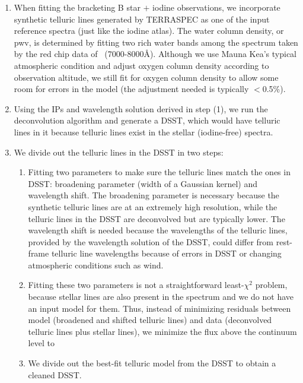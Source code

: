 \begin{enumerate}
\item When fitting the bracketing B star $+$ iodine observations, we
  incorporate synthetic telluric lines generated by TERRASPEC as one of
  the input reference spectra (just like the iodine atlas). The water
  column density, or pwv, is determined by fitting two rich water bands
  among the spectrum taken by the red chip data of \keck\
  (7000-8000\AA). Although we use Mauna Kea's typical atmospheric
  condition and adjust oxygen column density according to observation
  altitude, we still fit for oxygen column density to allow some room
  for errors in the model (the adjustment needed is typically $<$0.5\%).
\item Using the IPs and wavelength solution derived in step (1), we
  run the deconvolution algorithm and generate a DSST, which would
  have telluric lines in it because telluric lines exist in the
  stellar (iodine-free) spectra.
\item We divide out the telluric lines in the DSST in two steps: 
  \begin{enumerate}
  \item Fitting two parameters to make sure the telluric lines match
    the ones in DSST: broadening parameter (width of a Gaussian
    kernel) and wavelength shift. The broadening parameter is
    necessary because the synthetic telluric lines are at an extremely
    high resolution, while the telluric lines in the DSST are
    deconvolved but are typically lower. The wavelength shift is
    needed because the wavelengths of the telluric lines, provided by
    the wavelength solution of the DSST, could differ from rest-frame
    telluric line wavelengths because of errors in DSST or changing
    atmospheric conditions such as wind. 
  \item Fitting these two parameters is not a straightforward
    least-$\chi^2$ problem, because stellar lines are also present in the
    spectrum and we do not have an input model for them. Thus, instead of
    minimizing residuals between model (broadened and shifted telluric
    lines) and data (deconvolved telluric lines plus stellar lines), we
    minimize the flux above the continuum level to 
  \item We divide out the best-fit telluric model from the DSST to
    obtain a cleaned DSST.
  \end{enumerate}
\end{enumerate}

